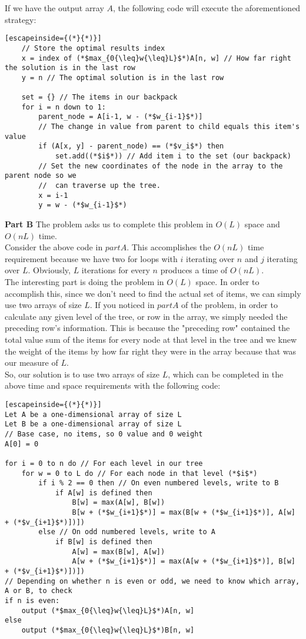 \documentclass{article}
\begin{document}
	If we have the output array $A$, the following code will execute the aforementioned strategy:
	
	\begin{lstlisting}[escapeinside={(*}{*)}]
	// Store the optimal results index
	x = index of (*$max_{0{\leq}w{\leq}L}$*)A[n, w] // How far right the solution is in the last row
	y = n // The optimal solution is in the last row
	
	set = {} // The items in our backpack
	for i = n down to 1:
		parent_node = A[i-1, w - (*$w_{i-1}$*)]
		// The change in value from parent to child equals this item's value
		if (A[x, y] - parent_node) == (*$v_i$*) then
			set.add((*$i$*)) // Add item i to the set (our backpack)
		// Set the new coordinates of the node in the array to the parent node so we
		// 	can traverse up the tree.
		x = i-1
		y = w - (*$w_{i-1}$*)
	\end{lstlisting}
	
	\textbf{Part B} The problem asks us to complete this problem in $O(L)$ space and $O(nL)$ time.\\
	
	Consider the above code in $part A$.  This accomplishes the $O(nL)$ time requirement because we have two for loops with $i$ iterating over $n$ and $j$ iterating over $L$.  Obviously, $L$ iterations for every $n$ produces a time of $O(nL)$.  \\
	
	The interesting part is doing the problem in $O(L)$ space.  In order to accomplish this, since we don't need to find the actual set of items, we can simply use two arrays of size $L$.  If you noticed in $part A$ of the problem, in order to calculate any given level of the tree, or row in the array, we simply needed the preceding row's information.  This is because the "preceding row" contained the total value sum of the items for every node at that level in the tree and we knew the weight of the items by how far right they were in the array because that was our measure of $L$.\\
	
	So, our solution is to use two arrays of size $L$, which can be completed in the above time and space requirements with the following code:
	\begin{lstlisting}[escapeinside={(*}{*)}]
Let A be a one-dimensional array of size L
Let B be a one-dimensional array of size L
// Base case, no items, so 0 value and 0 weight
A[0] = 0

for i = 0 to n do // For each level in our tree
	for w = 0 to L do // For each node in that level (*$i$*)
		if i % 2 == 0 then // On even numbered levels, write to B
			if A[w] is defined then
				B[w] = max(A[w], B[w])
				B[w + (*$w_{i+1}$*)] = max(B[w + (*$w_{i+1}$*)], A[w] + (*$v_{i+1}$*)])])
		else // On odd numbered levels, write to A
			if B[w] is defined then
				A[w] = max(B[w], A[w])
				A[w + (*$w_{i+1}$*)] = max(A[w + (*$w_{i+1}$*)], B[w] + (*$v_{i+1}$*)])])
// Depending on whether n is even or odd, we need to know which array, A or B, to check
if n is even:
	output (*$max_{0{\leq}w{\leq}L}$*)A[n, w]
else 
	output (*$max_{0{\leq}w{\leq}L}$*)B[n, w]
	\end{lstlisting}
\end{document}
